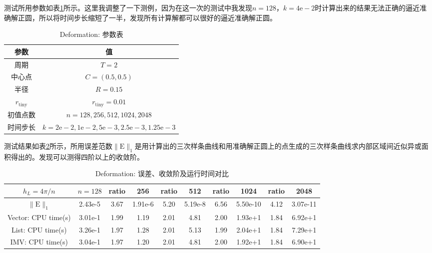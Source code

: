 \documentclass[a4paper,twoside]{ctexart}
\begin{document}
测试所用参数如表\ref{tab:deformation1}所示。这里我调整了一下测例，因为在这一次的测试中我发现$n=128$，$k=4\mathrm{e}-2$时计算出来的结果无法正确的逼近准确解正圆，所以将时间步长缩短了一半，发现所有计算解都可以很好的逼近准确解正圆。
\begin{table}[htbp]
    \centering\begin{tabular}{c|c}
        \hline
        参数&值\\
        \hline
        周期&$T=2$\\
        中心点&$C=(0.5,0.5)$\\
        半径&$R=0.15$\\
        $r_{\mathrm{tiny}}$&$r_{\mathrm{tiny}}=0.01$\\
        初值点数&$n=128,256,512,1024,2048$\\
        时间步长&$k=2\mathrm{e}-2,1\mathrm{e}-2,5\mathrm{e}-3,2.5\mathrm{e}-3,1.25\mathrm{e}-3$\\
        \hline
    \end{tabular}
    \caption{Deformation: 参数表}
    \label{tab:deformation1}
\end{table}

测试结果如表\ref{tab:deformation2}所示，所用误差范数$\|\mathrm{E}\|_1$是用计算出的三次样条曲线和用准确解正圆上的点生成的三次样条曲线求内部区域间近似异或面积得出的。发现可以测得四阶以上的收敛阶。

\begin{table}[htbp]
    \centering\begin{tabular}{c|ccccccccc}
        \hline
        $h_L=4\pi/n$&$n=128$&ratio&256&ratio&512&ratio&1024&ratio&2048\\
        \hline
        $\|\mathrm{E}\|_1$&2.43e-5&3.67&1.91e-6&5.20&5.19e-8&6.56&5.50e-10&4.12&3.07e-11\\
        \hline
        Vector: CPU time(s)&3.01e-1&1.99&1.19&2.01&4.81&2.00&1.93e+1&1.84&6.92e+1\\
        \hline
        List: CPU time(s)&3.26e-1&1.97&1.28&2.01&5.13&1.99&2.04e+1&1.84&7.29e+1\\
        \hline
        IMV: CPU time(s)&3.04e-1&1.97&1.20&2.01&4.81&2.00&1.92e+1&1.84&6.90e+1\\
        \hline
    \end{tabular}
    \caption{Deformation: 误差、收敛阶及运行时间对比}
    \label{tab:deformation2}
\end{table}
\end{document}
